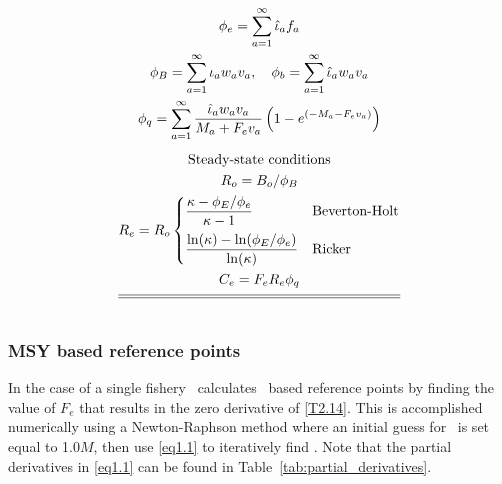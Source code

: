 \begin{multicols}{2}
\begin{tablehere}
\begin{gather}
            \phi_e=\sum_{a=1}^\infty \hat{\iota}_a f_a          \label{T2.10}\\
            \phi_B=\sum_{a=1}^\infty \iota_a w_a v_a, \quad
            \phi_b=\sum_{a=1}^\infty \hat{\iota}_a w_a v_a      \label{T2.11}\\
            \phi_q=\sum_{a=1}^\infty
                \frac{ \hat{\iota}_a w_a v_a}{M_a+F_ev_a}
                \left(1-e^{(-M_a-F_ev_a)}\right)                \label{T2.11b}\\[1ex]
        \mbox{Steady-state conditions} \nonumber \\
            R_o=B_o/ \phi_B                                     \label{T2.12}\\
            R_e=R_o\begin{cases}
            \dfrac{\kappa-\phi_E/\phi_e}{\kappa-1}&\mbox{Beverton-Holt}\\[2ex]
            \dfrac{\ln(\kappa)-\ln(\phi_E/\phi_e)}{\ln(\kappa)}& \mbox{Ricker}
            \end{cases}                                         \label{T2.13}\\
            C_e=F_e R_e \phi_q                                  \label{T2.14}\\[1ex]
        \hline \hline \nonumber
    \end{gather}
    \normalEq
\end{tablehere}
 


\subsubsection{MSY based reference points} %
\label{ssub:msy_based_reference_points}

In the case of a single fishery \iscam\ calculates \fmsy\ based reference points by finding the value of $F_e$ that results in the zero derivative of \eqref{T2.14}.  This is accomplished numerically using a Newton-Raphson method where an initial guess for \fmsy\ is set equal to 1.0$M$, then use \eqref{eq1.1} to iteratively find \fmsy.  Note that the partial derivatives in \eqref{eq1.1} can be found in Table~\ref{tab:partial_derivatives}.


\end{multicols}
